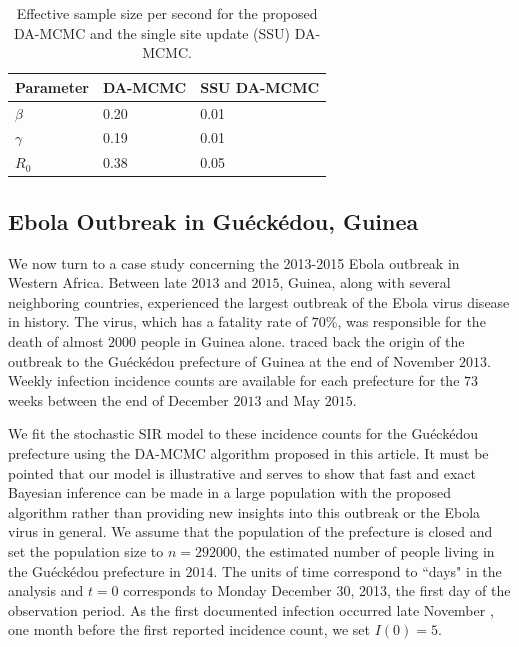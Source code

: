 \documentclass[12pt]{article}
\begin{document}
\begin{table}
	\caption{Effective sample size per second for the proposed DA-MCMC and the single site update (SSU) DA-MCMC.
		\label{tab:E6}}
	\begin{center}
		\begin{tabular}{ C{2cm}| *{2}{C{3cm}}}
			Parameter & DA-MCMC & SSU DA-MCMC \\ 
			\hline
			$\beta$ & 0.20 & 0.01 \\ 
			$\gamma$ & 0.19 & 0.01 \\ 
			$R_0$ & 0.38 & 0.05 \\
			\hline
		\end{tabular}
	\end{center}
\end{table}

\subsection{Ebola Outbreak in Gu\'eck\'edou, Guinea}
\label{sec:ebo}

We now turn to a case study concerning the 2013-2015 Ebola outbreak in Western Africa.
Between late $2013$ and $2015$, Guinea, along with several neighboring countries, experienced the largest outbreak of the Ebola virus disease in history. The virus, which has a fatality rate of $70\%$, was responsible for the death of almost $2000$ people in Guinea alone.
\cite{Coltart.2017} traced back the origin of the outbreak to the Gu\'eck\'edou prefecture of Guinea at the end of November $2013$. Weekly infection incidence counts are available for each prefecture for the $73$ weeks between the end of December $2013$ and May $2015$.

We fit the stochastic SIR model to these incidence counts for the Gu\'eck\'edou prefecture using the DA-MCMC algorithm proposed in this article.
It must be pointed that our model is illustrative and serves to show that fast and exact Bayesian inference can be made in a large population with the proposed algorithm rather than providing new insights into this outbreak or the Ebola virus in general. We assume that the population of the prefecture is closed and set the population size to $n = 292000$, the estimated number of people living in the Gu\'eck\'edou prefecture in $2014$.
The units of time correspond to ``days" in the analysis and $t=0$ corresponds to Monday December 30, 2013, the first day of the observation period.
As the first documented infection occurred late November \cite{Coltart.2017}, one month before the first reported incidence count, we set $I(0) = 5$.
\end{document}
